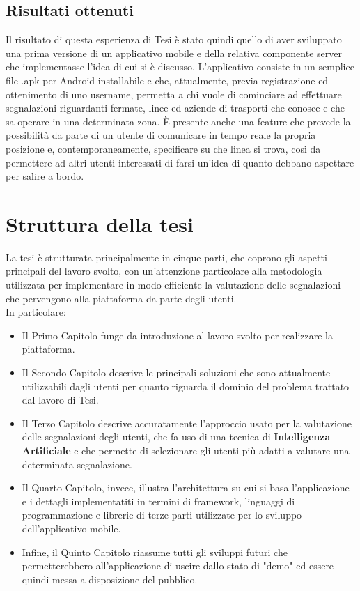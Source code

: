     \subsection{Risultati ottenuti}
        Il risultato di questa esperienza di Tesi è stato quindi quello di aver sviluppato una prima versione di un applicativo mobile e della relativa componente server che implementasse l'idea di cui si è discusso. L'applicativo consiste in un semplice file .apk per Android installabile e che, attualmente, previa registrazione ed ottenimento di uno username, permetta a chi vuole di cominciare ad effettuare segnalazioni riguardanti fermate, linee ed aziende di trasporti che conosce e che sa operare in una determinata zona.
        È presente anche una feature che prevede la possibilità da parte di un utente di comunicare in tempo reale la propria posizione e, contemporaneamente, specificare su che linea si trova, così da permettere ad altri utenti interessati di farsi un'idea di quanto debbano aspettare per salire a bordo.
        
        \newpage

\section{Struttura della tesi}
        La tesi è strutturata principalmente in cinque parti, che coprono gli aspetti principali del lavoro svolto, con un'attenzione particolare alla metodologia utilizzata per implementare in modo efficiente la valutazione delle segnalazioni che pervengono alla piattaforma da parte degli utenti. \\
        In particolare:
        \begin{itemize}
            \item Il Primo Capitolo funge da introduzione al lavoro svolto per realizzare la piattaforma.
            \item Il Secondo Capitolo descrive le principali soluzioni che sono attualmente utilizzabili dagli utenti per quanto riguarda il dominio del problema trattato dal lavoro di Tesi.
            \item Il Terzo Capitolo descrive accuratamente l'approccio usato per la valutazione delle segnalazioni degli utenti, che fa uso di una tecnica di \textbf{Intelligenza Artificiale} e che permette di selezionare gli utenti più adatti a valutare una determinata segnalazione.
            \item Il Quarto Capitolo, invece, illustra l'architettura su cui si basa l'applicazione e i dettagli implementatiti in termini di framework, linguaggi di programmazione e librerie di terze parti utilizzate per lo sviluppo dell'applicativo mobile.
            \item Infine, il Quinto Capitolo riassume tutti gli sviluppi futuri che permetterebbero all'applicazione di uscire dallo stato di "demo" ed essere quindi messa a disposizione del pubblico.
        \end{itemize}
